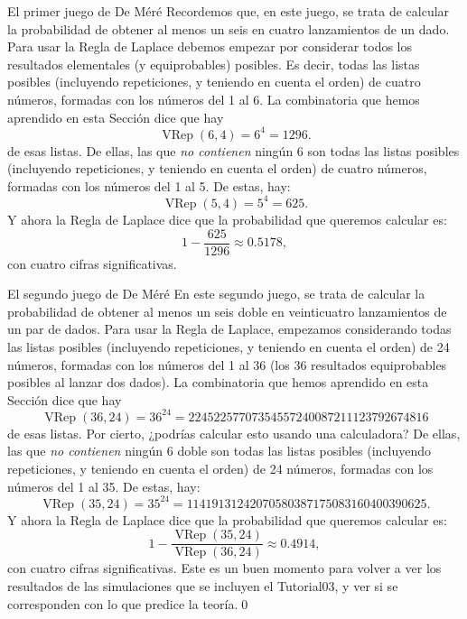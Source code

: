 \begin{Ejemplo}{El primer juego de De Méré}\label{cap03:ejem:DeMere01}
    Recordemos que, en este juego, se trata de calcular la probabilidad de obtener al menos un seis en cuatro lanzamientos de un dado. Para usar la Regla de Laplace debemos empezar por considerar todos los resultados elementales (y equiprobables) posibles. Es decir, todas las listas posibles (incluyendo repeticiones, y teniendo en cuenta el orden) de  cuatro números, formadas con los números del 1 al 6. La combinatoria que hemos aprendido en esta Sección dice que hay
    \[\operatorname{VRep}(6,4)=6^4=1296.\]
    de esas listas. De ellas, las que {\em no contienen} ningún 6 son todas las listas posibles (incluyendo repeticiones, y teniendo en cuenta el orden) de cuatro números,  formadas con los números del 1 al 5. De estas, hay:
    \[\operatorname{VRep}(5,4)=5^4=625.\]
    Y ahora la Regla de Laplace dice que la probabilidad que queremos calcular es:
    \[1-\dfrac{625}{1296}\approx 0.5178,\]
    con cuatro cifras significativas.
\end{Ejemplo}

\begin{Ejemplo}{El segundo juego de De Méré}\label{cap03:ejem:DeMere02}
    En este segundo juego, se trata de calcular la probabilidad de obtener al menos un seis doble en veinticuatro lanzamientos de un par de dados. Para usar la Regla de Laplace, empezamos considerando todas las listas posibles (incluyendo repeticiones, y teniendo en cuenta el orden) de  24 números, formadas con los números del 1 al 36 (los 36 resultados equiprobables posibles al lanzar dos dados). La combinatoria que hemos aprendido en esta Sección dice que hay
    \[\operatorname{VRep}(36,24)=36^{24}=22452257707354557240087211123792674816\]
    de esas listas. Por cierto, ¿podrías calcular esto usando una calculadora? De ellas, las que {\em no contienen} ningún 6 doble son todas las listas posibles (incluyendo repeticiones, y teniendo en cuenta el orden) de 24 números,  formadas con los números del 1 al 35. De estas, hay:
    \[\operatorname{VRep}(35,24)=35^{24}=11419131242070580387175083160400390625.\]
    Y ahora la Regla de Laplace dice que la probabilidad que queremos calcular es:
    \[1-\dfrac{\operatorname{VRep}(35,24)}{\operatorname{VRep}(36,24)}\approx 0.4914,\]
    con cuatro cifras significativas. Este es un buen momento para volver a ver los resultados de las simulaciones que se incluyen el Tutorial03, y ver si se corresponden con lo que predice la teoría.\qed
\end{Ejemplo}

